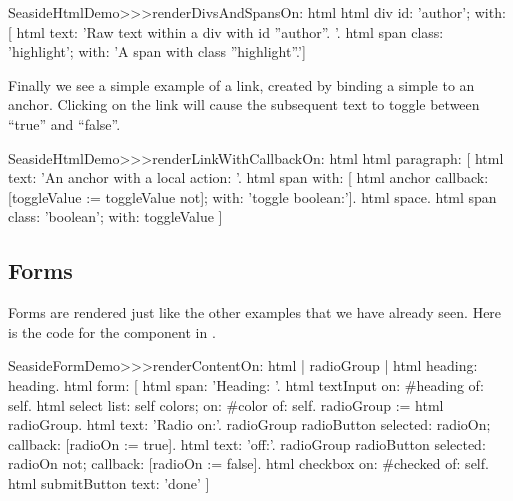 \documentclass[a4paper,10pt,twoside]{book}
\begin{document}
\begin{code}{}
SeasideHtmlDemo>>>renderDivsAndSpansOn: html 
	html div
		id: 'author';
		with: [
			html text: 'Raw text within a div with id ''author''. '.
			html span
				class: 'highlight';
				with: 'A span with class ''highlight''.']
\end{code}

Finally we see a simple example of a link, created by binding a simple  to an anchor. 
Clicking on the link will cause the subsequent text to toggle between ``true'' and ``false''.

\begin{code}{}
SeasideHtmlDemo>>>renderLinkWithCallbackOn: html 
	html paragraph: [
		html text: 'An anchor with a local action: '.
		html span with: [
			html anchor
				callback: [toggleValue := toggleValue not];
				with: 'toggle boolean:'].
		html space.
		html span
			class: 'boolean';
			with: toggleValue ]
\end{code}




\subsection{Forms}

Forms are rendered just like the other examples that we have already seen.
Here is the code for the  component in .

\begin{code}{}
SeasideFormDemo>>>renderContentOn: html
	| radioGroup |
	html heading: heading.
	html form: [
		html span: 'Heading: '.
		html textInput on: #heading of: self.
		html select
			list: self colors;
			on: #color of: self.
		radioGroup := html radioGroup.
		html text: 'Radio on:'.
		radioGroup radioButton
			selected: radioOn;
			callback: [radioOn := true].
		html text: 'off:'.
		radioGroup radioButton
			selected: radioOn not;
			callback: [radioOn := false].
		html checkbox on: #checked of: self.
		html submitButton
			text: 'done' ]
\end{code}{}
\end{document}
